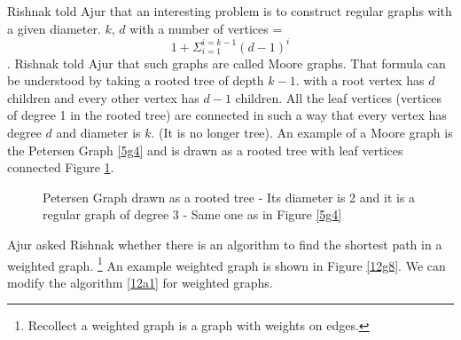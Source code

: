 Rishnak told Ajur that an interesting problem is to construct regular graphs with a given diameter. $k$, $d$ with a number of vertices = $$1+\Sigma_{i=1}^{i=k-1} (d-1)^i$$.  Rishnak told Ajur that such graphs are called Moore graphs. That formula can be understood by taking a rooted tree of depth $k-1$. with a root vertex has $d$ children and every other vertex has $d-1$ children. All the leaf vertices (vertices of degree 1 in the rooted tree) are connected in such a way that every vertex has degree $d$ and diameter is $k$. (It is no longer tree). An example of a Moore graph is the Petersen Graph \ref{5g4} and is drawn as a rooted tree with leaf vertices connected Figure \ref{12g7}.
\begin{figure}
\caption{ Petersen Graph drawn as a rooted tree - Its diameter is 2 and it is a regular graph of degree 3 - Same one as in Figure  \ref{5g4}}\label{12g7}
\end{figure}



Ajur asked Rishnak whether there is an algorithm to find the shortest path in a weighted graph. \footnote{Recollect a weighted graph is a graph with weights on edges.} An example weighted graph is shown in Figure \ref{12g8}.
We can modify the algorithm \ref{12a1} for weighted graphs.

